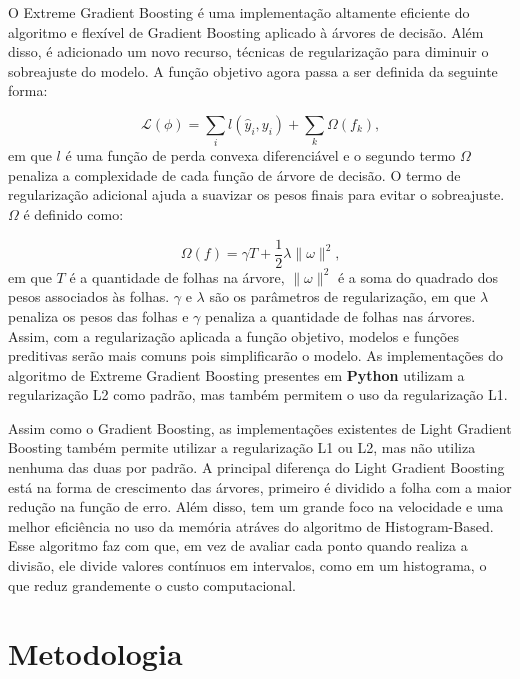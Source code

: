 \documentclass[
  12pt,
  a4paper,
]{scrreprt}
\begin{document}
\vspace{12pt}

O Extreme Gradient Boosting é uma implementação altamente eficiente do
algoritmo e flexível de Gradient Boosting aplicado à árvores de decisão.
Além disso, é adicionado um novo recurso, técnicas de regularização para
diminuir o sobreajuste do modelo. A função objetivo agora passa a ser
definida da seguinte forma:

\[
\mathcal{L}\left(\phi\right) = \sum_{i}l\left(\hat{y}_{i}, y_{i}\right) + \sum_{k}\Omega\left(f_{k}\right)\text{,}
\] em que \(l\) é uma função de perda convexa diferenciável e o segundo
termo \(\Omega\) penaliza a complexidade de cada função de árvore de
decisão. O termo de regularização adicional ajuda a suavizar os pesos
finais para evitar o sobreajuste. \(\Omega\) é definido como:

\[
\Omega\left(f\right) = \gamma T + \frac{1}{2}\lambda\|\omega\|^{2}\text{,}
\] em que \(T\) é a quantidade de folhas na árvore, \(\|\omega\|^{2}\) é
a soma do quadrado dos pesos associados às folhas. \(\gamma\) e
\(\lambda\) são os parâmetros de regularização, em que \(\lambda\)
penaliza os pesos das folhas e \(\gamma\) penaliza a quantidade de
folhas nas árvores. Assim, com a regularização aplicada a função
objetivo, modelos e funções preditivas serão mais comuns pois
simplificarão o modelo. As implementações do algoritmo de Extreme
Gradient Boosting presentes em \textbf{Python} utilizam a regularização
L2 como padrão, mas também permitem o uso da regularização L1.

\vspace{12pt}

Assim como o Gradient Boosting, as implementações existentes de Light
Gradient Boosting também permite utilizar a regularização L1 ou L2, mas
não utiliza nenhuma das duas por padrão. A principal diferença do Light
Gradient Boosting está na forma de crescimento das árvores, primeiro é
dividido a folha com a maior redução na função de erro. Além disso, tem
um grande foco na velocidade e uma melhor eficiência no uso da memória
atráves do algoritmo de Histogram-Based. Esse algoritmo faz com que, em
vez de avaliar cada ponto quando realiza a divisão, ele divide valores
contínuos em intervalos, como em um histograma, o que reduz grandemente
o custo computacional.

\chapter{Metodologia}\label{metodologia}
\end{document}
